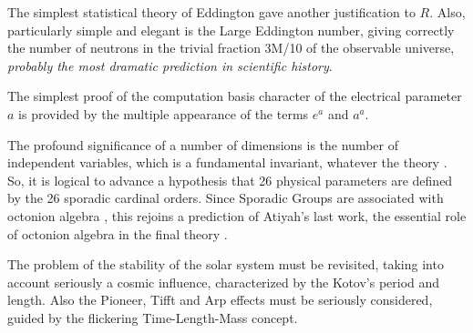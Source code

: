 \documentclass[twoside,draft]{article}
\begin{document}
\begin{sloppypar}
The simplest statistical theory of Eddington gave another justification to $R$. Also, particularly
simple and elegant is the Large Eddington number, giving correctly the number of neutrons in the
trivial fraction 3M/10 of the observable universe, \textit{probably the most dramatic prediction in
 scientific history}.

The simplest proof of the computation basis character of the electrical parameter $a$ is provided
by the multiple appearance of the terms $e^{a}$ and $a^{a}$.

The profound significance of a number of dimensions is the number of independent variables,
which is a fundamental invariant, whatever the theory \cite{Weigel}. So, it is logical to advance a
hypothesis that 26 physical parameters are defined by the 26 sporadic cardinal orders. Since
Sporadic Groups are associated with octonion algebra \cite{Atiyah2}, this rejoins a prediction of Atiyah's last
work, the essential role of octonion algebra in the final theory \cite{Atiyah1}.

The problem of the stability of the solar system must be revisited, taking into account
seriously a cosmic influence, characterized by the Kotov's period and length. Also the Pioneer, Tifft
and Arp effects must be seriously considered, guided by the flickering Time-Length-Mass concept.


\end{sloppypar}
\end{document}
